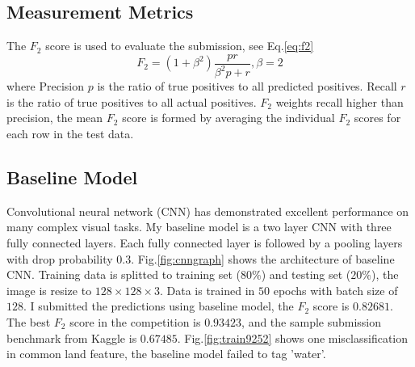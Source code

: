 \documentclass[11pt,oneside,a4paper]{article}
\begin{document}
\begin{multicols}{2}
\subsection{Measurement Metrics}
The $F_2$ score is used to evaluate the submission, see Eq.\ref{eq:f2}
\begin{equation}
F_{2} = (1+\beta^{2})\frac{pr}{\beta^2 p + r}, \beta = 2 \label{eq:f2}
\end{equation}
where Precision $p$ is the ratio of true positives to all predicted positives. Recall $r$ is the ratio of true positives to all actual positives. $F_2$ weights recall higher than precision, the mean $F_2$ score is formed by averaging the individual $F_2$ scores for each row in the test data. 

\subsection{Baseline Model}
Convolutional neural network (CNN) has demonstrated excellent performance on many complex visual tasks. My baseline model is a two layer CNN with three fully connected  layers. Each fully connected layer is followed by a pooling layers with drop probability $0.3$. Fig.\ref{fig:cnngraph} shows the architecture of baseline CNN. Training data is splitted to training set ($80\%$) and testing set ($20\%$), the image is resize to $128\times 128\times 3$. Data is trained in $50$ epochs with batch size of $128$. I submitted the predictions using baseline model, the $F_2$ score is $0.82681$. The best $F_2$ score in the competition is $0.93423$, and the sample submission benchmark from Kaggle is $0.67485$. Fig.\ref{fig:train9252} shows one misclassification in common land feature, the baseline model failed to tag 'water'.


\end{multicols}
\end{document}
